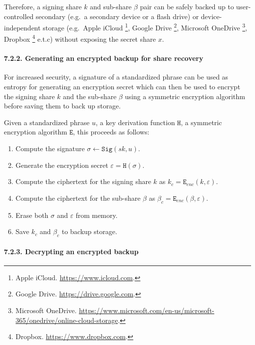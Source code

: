 \documentclass[
]{article}
\providecommand{\tightlist}{%
  \setlength{\itemsep}{0pt}\setlength{\parskip}{0pt}}
\begin{document}
Therefore, a signing share \(k\) and sub-share \(\beta\) pair can be
safely backed up to user-controlled secondary (e.g.~a secondary device
or a flash drive) or device-independent storage (e.g.~Apple iCloud
\footnote{Apple iCloud. \url{https://www.icloud.com}.}, Google Drive
\footnote{Google Drive. \url{https://drive.google.com}.}, Microsoft
OneDrive \footnote{Microsoft OneDrive.
  \url{https://www.microsoft.com/en-us/microsoft-365/onedrive/online-cloud-storage}.},
Dropbox \footnote{Dropbox. \url{https://www.dropbox.com}.} e.t.c)
without exposing the secret share \(x\).

\hypertarget{share-recovery-backup-encrypt}{%
\paragraph{7.2.2. Generating an encrypted backup for share
recovery}\label{share-recovery-backup-encrypt}}

For increased security, a signature of a standardized phrase can be used
as entropy for generating an encryption secret which can then be used to
encrypt the signing share \(k\) and the sub-share \(\beta\) using a
symmetric encryption algorithm before saving them to back up storage.

Given a standardized phrase \(u\), a key derivation function
\(\mathtt{H}\), a symmetric encryption algorithm \(\mathtt{E}\), this
proceeds as follows:

\begin{enumerate}
\def\labelenumi{\arabic{enumi}.}
\tightlist
\item
  Compute the signature \(\sigma \leftarrow \mathtt{Sig}(sk, u)\).
\item
  Generate the encryption secret \(\varepsilon = \mathtt{H}(\sigma)\).
\item
  Compute the ciphertext for the signing share \(k\) as
  \(k_c = \mathtt{E} _{enc}(k, \varepsilon)\).
\item
  Compute the ciphertext for the sub-share \(\beta\) as
  \(\beta _c = \mathtt{E} _{enc}(\beta, \varepsilon)\).
\item
  Erase both \(\sigma\) and \(\varepsilon\) from memory.
\item
  Save \(k_c\) and \(\beta _c\) to backup storage.
\end{enumerate}

\hypertarget{share-recovery-backup-decrypt}{%
\paragraph{7.2.3. Decrypting an encrypted
backup}\label{share-recovery-backup-decrypt}}
\end{document}
